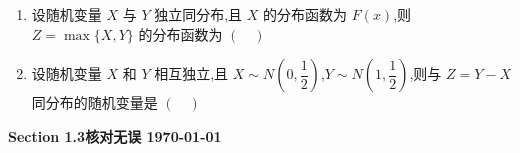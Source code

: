 \begin{enumerate}
    \item 设随机变量 $X$ 与 $Y$ 独立同分布,且 $X$ 的分布函数为 $F(x)$,则 $Z=\max\{X,Y\}$ 的分布函数为 $(\quad)$

    \item 设随机变量 $X$ 和 $Y$ 相互独立,且 $X\sim N\left(0,\dfrac{1}{2}\right)$,$Y\sim N\left(1,\dfrac{1}{2}\right)$,则与 $Z=Y-X$ 同分布的随机变量是 $(\quad)$
\end{enumerate}

\begin{center}
    \color{red}
    \textbf{Section 1.3核对无误 \today}
\end{center}